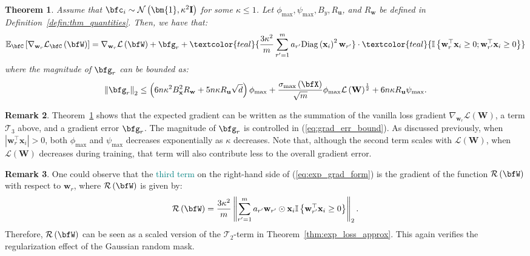 \documentclass[10pt]{article} %
\newtheorem{theorem}{Theorem}[section]
\theoremstyle{definition}
\newtheorem{remark}[theorem]{Remark}
\theoremstyle{plain}
\newcommand{\paren}[1]{\left(#1\right)}
\newcommand{\norm}[1]{\left\|#1\right\|}
\providecommand{\E}{\mathbb{E}}
\def\calL{{\mathcal{L}}}
\def\bfI{{\mathbf{I}}}\def\bfJ{{\mathbf{J}}}\def\bfK{{\mathbf{K}}}\def\bfL{{\mathbf{L}}}
\def\bfu{{\mathbf{u}}}\def\bfv{{\mathbf{v}}}\def\bfw{{\mathbf{w}}}\def\bfx{{\mathbf{x}}}
\begin{document}
\begin{theorem}
    \label{thm:exp_grad_form}
    Assume that $\bfc_i\sim\mathcal{N}\paren{\bm{1},\kappa^2\bfI}$ for some $\kappa\leq 1$. Let  $\phi_{\max},\psi_{\max}, B_y, R_{\bfu}$, and $R_{\bfw}$ be defined in Definition~\ref{defin:thm_quantities}.
    Then, we have that:
    \begin{equation}
        \label{eq:exp_grad_form}
        \begin{aligned}
        \E_{\bfC}\left[\nabla_{\bfw_r}\calL_{\bfC}\paren{\bfW}\right] = \nabla_{\bfw_r}\calL\paren{\bfW}+ \bfg_{r}
            + \textcolor{teal}{\frac{3\kappa^2}{m}\sum_{r'=1}^ma_{r'}{\rm Diag}\paren{\bfx_i}^2\bfw_{r'}} \cdot \textcolor{teal}{\mathbb{I}\left\{\bfw_{r}^\top\bfx_i\geq 0;\bfw_{r'}^\top\bfx_i\geq 0\right\}}
        \end{aligned}
    \end{equation}
    where the magnitude of $\bfg_{r}$ can be bounded as:
    \begin{equation}
        \label{eq:grad_err_bound}
        \begin{aligned}
            \norm{\bfg_{r}}_2 \leq \paren{6n\kappa^2B_{\bfx}^2R_{\bfw} + 5n\kappa R_{\bfu}\sqrt{d}}\phi_{\max} + \frac{\sigma_{\max}\paren{\bfX}}{\sqrt{m}}\phi_{\max}\calL\paren{\mathbf{W}}^{\frac{1}{2}}+ 6n\kappa R_{\bfu}\psi_{\max}.
        \end{aligned}
    \end{equation}
\end{theorem}

\begin{remark}
Theorem~\ref{thm:exp_grad_form} shows that the expected gradient can be written as the summation of the vanilla loss gradient $\nabla_{\bfw_r}\calL\paren{\mathbf{W}}$, a term $\mathcal{T}_3$ above, and a gradient error $\bfg_r$. 
The magnitude of $\bfg_r$ is controlled in (\ref{eq:grad_err_bound}). 
As discussed previously, when $\left|\bfw_r^\top\bfx_i\right| > 0$, both $\phi_{\max}$ and $\psi_{\max}$ decreases exponentially as $\kappa$ decreases. 
Note that, although the second term scales with $\calL\paren{\mathbf{W}}$, when $\calL\paren{\mathbf{W}}$ decreases during training, that term will also contribute less to the overall gradient error.
\end{remark}

\begin{remark}
One could observe that the \textcolor{teal}{third term} on the right-hand side of (\ref{eq:exp_grad_form}) is the gradient of the function $\mathcal{R}\paren{\bfW}$ with respect to $\bfw_r$, where $\mathcal{R}\paren{\bfW}$ is given by:
\[
    \mathcal{R}\paren{\bfW} = \frac{3\kappa^2}{m}\norm{\sum_{r'=1}^ma_{r'}\bfw_{r'}\odot\bfx_i\mathbb{I}\left\{\bfw_{r'}^\top\bfx_i\geq 0\right\}}_2.
\]
Therefore, $\mathcal{R}\paren{\bfW}$ can be seen as a scaled version of the $\mathcal{T}_2$-term in Theorem~\ref{thm:exp_loss_approx}. This again verifies the regularization effect of the Gaussian random mask.
\end{remark}
\end{document}
